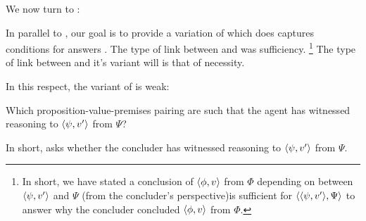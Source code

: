 \begin{note}[Introduction]
  We now turn to \qHow{}:
  \vspace{-\baselineskip}
  \begin{quote}
    \questionHowBasic*
  \end{quote}

  In parallel to \qWhyV{}, our goal is to provide a variation of \qHow{} which does captures conditions for answers \qHow{}.
  The type of link between \qWhyV{} and \qWhy{} was sufficiency.%
  \footnote{
    In short, we have stated a conclusion of \(\langle \phi, v \rangle\) from \(\Phi\) {\color{red} depending} on \support{} between \(\langle \psi, v' \rangle\) and \(\Psi\) (from the concluder's perspective)is sufficient for \(\langle \langle \psi, v' \rangle, \Psi \rangle\) to answer why the concluder concluded \(\langle \phi, v \rangle\) from \(\Phi\).
  }
  The type of link between \qHow{} and it's variant will is that of necessity.

  In this respect, the variant of \qHow{} is weak:

  \begin{question}[\qHowV{}]
    \label{q:how:v}
    Which proposition-value-premises pairing are such that the agent has witnessed reasoning to \(\langle \psi, v' \rangle\) from \(\Psi\)?
  \end{question}

  In short, \qWhyV{} asks whether the concluder has witnessed reasoning to \(\langle \psi, v' \rangle\) from \(\Psi\).
\end{note}

